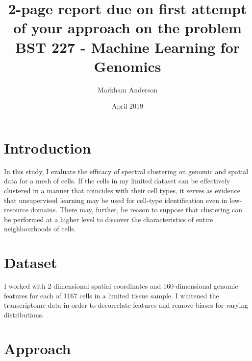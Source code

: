 \documentclass{article}
\title{2-page report due on first attempt of your approach on the problem \\
\large BST 227 - Machine Learning for Genomics}
\author{Markham Anderson}
\date{April 2019}
\newcommand{\nData}{1167}
\begin{document}
\maketitle
\small

\section{Introduction}

In this study, I evaluate the efficacy of spectral clustering on genomic and spatial data for a mesh of cells. If the cells in my limited dataset can be effectively clustered in a manner that coincides with their cell types, it serves as evidence that unsupervised learning may be used for cell-type identification even in low-resource domains. There may, further, be reason to suppose that clustering can be performed at a higher level to discover the characteristics of entire neighbourhoods of cells.





\section{Dataset}

I worked with 2-dimensional spatial coordinates and 160-dimensional genomic features for each of \nData{} cells in a limited tissue sample. I whitened the transcriptome data in order to decorrelate features and remove biases for varying distributions.

\section{Approach}
\end{document}
